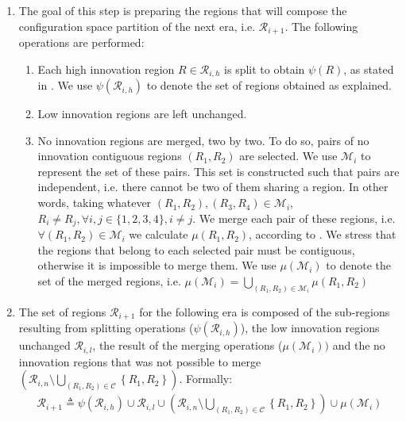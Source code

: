 \begin{enumerate}
\item The goal of this step is preparing the regions that will compose the configuration space partition of the next era, i.e. $\mathscr{R}_{i+1}$. The following operations are performed:
	\begin{enumerate}
		\item Each high innovation region $R\in\mathscr{R}_{i,h}$ is split to obtain $\psi(R)$, as stated in . We use $\psi\left(\mathscr{R}_{i,h}\right)$ to denote the set of regions obtained as explained.
		\item Low innovation regions are left unchanged.
		\item No innovation regions are merged, two by two. To do so, pairs of no innovation contiguous regions $(R_1,R_2)$ are selected. We use $\mathscr{M}_i$ to represent the set of these pairs. This set is constructed such that pairs are independent, i.e. there cannot be two of them sharing a region. In other words, taking whatever $(R_1,R_2),(R_3,R_4) \in \mathscr{M}_i$, $R_i \neq R_j, \forall i,j\in\lbrace1,2,3,4\rbrace, i\neq j$. 
We merge each pair of these regions, i.e. $\forall (R_1,R_2)\in\mathscr{M}_i$ we calculate $\mu(R_1,R_2)$, according to .
We stress that the regions that belong to each selected pair must be contiguous, otherwise it is impossible to merge them. We use $\mu(\mathscr{M}_i)$ to denote the set of the merged regions, i.e. $\mu(\mathscr{M}_i) = \bigcup_{(R_1,R_2)\in\mathscr{M}_i} \mu(R_1,R_2)$
	\end{enumerate}


\item The set of regions $\mathcal{R}_{i+1}$ for the following era is composed of the sub-regions resulting from splitting operations ($\psi\left(\mathscr{R}_{i,h}\right)$), the low innovation regions unchanged $\mathcal{R}_{i,l}$, the result of the merging operations ($\mu(\mathscr{M}_i))$ and the no innovation regions that was not possible to merge $\left(\mathcal{R}_{i,n}\setminus\bigcup_{\left(R_{1},R_{2}\right)\in\mathcal{C}}\left\{ R_{1},R_{2}\right\} \right)$. Formally:
	\begin{align} 
	\mathcal{R}_{i+1} \triangleq
	\psi\left(\mathscr{R}_{i,h}\right) \cup \mathcal{R}_{i,l}\cup
	\left(\mathcal{R}_{i,n}\setminus\bigcup_{\left(R_{1},R_{2}\right)\in\mathcal{C}}\left\{ R_{1},R_{2}\right\} \right)\cup \mu(\mathscr{M}_i)
	\end{align}
\end{enumerate}



